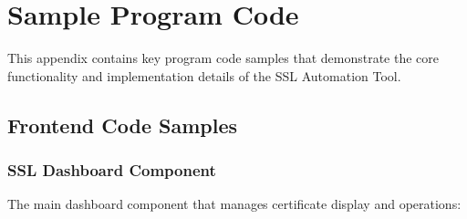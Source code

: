 
\chapter{Sample Program Code} %

\label{AppendixB} %


This appendix contains key program code samples that demonstrate the core functionality and implementation details of the SSL Automation Tool.

\section{Frontend Code Samples}

\subsection{SSL Dashboard Component}

The main dashboard component that manages certificate display and operations:


